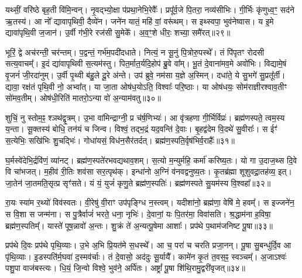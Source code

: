 यथ्सीं॒ वरि॑ष्ठे बृह॒ती वि॑मि॒न्वन्।
नृ॒वद्भ्यो॒क्षा प॑प्रथा॒नेभि॒रेवैः᳚।
प्रपू᳚र्व॒जे पि॒तरा॒ नव्य॑सीभिः।
गी॒र्भिः कृ॑णुध्व॒ꣳ॒ सद॑ने ऋ॒तस्य॑।
आ नो᳚ द्यावापृथिवी॒ दैव्ये॑न।
जने॑न यातं॒ महि॑ वां॒ वरू॑थम्।
स इथ्स्वपा॒ भुव॑नेष्वास।
य इ॒मे द्यावा॑पृथि॒वी ज॒जान॑।
उ॒र्वी ग॑भी॒रे रज॑सी सु॒मेके᳚।
अ॒व॒ꣳ॒शे धीरः॒ शच्या॒ समै॑रत्॥२९॥\ip

भूरिं॒ द्वे अच॑रन्ती॒ चर॑न्तम्।
प॒द्वन्तं॒ गर्भ॑म॒पदी॑दधाते।
नित्यं॒ न सू॒नुं पि॒त्रोरु॒पस्थे᳚।
तं पि॑पृतꣳ रोदसी सत्य॒वाचम्᳚।
इ॒दं द्या॑वापृथिवी स॒त्यम॑स्तु।
पित॒र्मात॒र्यदि॒होप॑ ब्रु॒वे वा᳚म्।
भू॒तं दे॒वाना॑मव॒मे अवो॑भिः।
विद्यामे॒षं वृ॒जनं॑ जी॒रदा॑नुम्।
उ॒र्वी पृ॒थ्वी ब॑हु॒ले दू॒रे अ॑न्ते।
उप॑ ब्रुवे॒ नम॑सा य॒ज्ञे अ॒स्मिन्।
दधा॑ते॒ ये सु॒भगे॑ सु॒प्रतू᳚र्ती।
द्यावा॒ रक्ष॑तं पृथि॒वी नो॒ अभ्वा᳚त्।
या जा॒ता ओष॑ध॒योऽति॒ विश्वाः᳚ परि॒ष्ठाः।
या ओष॑धयः॒ सोम॑राज्ञीरश्वाव॒तीꣳ सो॑मव॒तीम्।
ओष॑धी॒रिति॑ मातरो॒\-ऽन्या वो॑ अ॒न्याम॑वतु॥३०॥\ip\anuvakamend[ह॒विर्नो॑ दाद्भभूव रा॒तिं पू॒र्वहू॑ताव॒र्कैरै॑रद॒स्मिन्पञ्च॑ च]

शुचिं॒ नु स्तोम॒ꣴ॒ श्ञथ॑द्वृ॒त्रम्।
उ॒भा वा॑मिन्द्राग्नी॒ प्र च॑र्\mbox{}ष॒णिभ्यः॑।
आ वृ॑त्रहणा गी॒र्भिर्विप्रः॑।
ब्रह्म॑णस्पते॒ त्वम॒स्य य॒न्ता।
सू॒क्तस्य॑ बोधि॒ तन॑यं च जिन्व।
विश्वं॒ तद्भ॒द्रं यद॒वन्ति॑ दे॒वाः।
बृ॒हद्व॑देम वि॒दथे॑ सु॒वीराः᳚।
स ईꣳ॑ स॒त्येभिः॒ सखि॑भिः शु॒चद्भिः॑।
गोधा॑यसं॒ विध॑न॒सैर॑तर्दत्।
ब्रह्म॑ण॒स्पति॒र्वृष॑भिर्व॒राहैः᳚॥३१॥\ip

घ॒र्मस्वे॑देभि॒र्द्रवि॑णं॒ व्या॑नट्।
ब्रह्म॑ण॒स्पते॑रभवद्यथाव॒शम्।
स॒त्यो म॒न्युर्महि॒ कर्मा॑ करिष्य॒तः।
यो गा उ॒दाज॒थ्स दि॒वे वि चा॑भजत्।
म॒हीव॑ री॒तिः शव॑सा सर॒त्पृथ॑क्।
इन्धा॑नो अ॒ग्निं व॑नवद्वनुष्य॒तः।
कृ॒तब्र॑ह्मा शूशुवद्रा॒तह॑व्य॒ इत्।
जा॒तेन॑ जा॒तमति॒सृत्प्र सृꣳ॑सते।
यं यं॒ युजं॑ कृणु॒ते ब्रह्म॑ण॒स्पतिः॑।
ब्रह्म॑णस्पते सु॒यम॑स्य वि॒श्वहा᳚॥३२॥\ip

रा॒यः स्या॑म र॒थ्यो॑ विव॑स्वतः।
वी॒रेषु॑ वी॒राꣳ उप॑पृङ्ग्धि न॒स्त्वम्।
यदीशा॑नो॒ ब्रह्म॑णा॒ वेषि॑ मे॒ हवम्᳚।
स इज्जने॑न॒ स वि॒शा स जन्म॑ना।
स पु॒त्रैर्वाजं॑ भरते॒ धना॒ नृभिः॑।
दे॒वानां॒ यः पि॒तर॑मा॒ विवा॑सति।
श्र॒द्धाम॑ना ह॒विषा॒ ब्रह्म॑ण॒स्पतिम्᳚।
यास्ते॑ पूष॒न्नावो॑ अ॒न्तः।
शु॒क्रं ते॑ अ॒न्यत्पू॒षेमा आशाः᳚।
प्रप॑थे प॒थाम॑जनिष्ट पू॒षा॥३३॥\ip

प्रप॑थे दि॒वः प्रप॑थे पृथि॒व्याः।
उ॒भे अ॒भि प्रि॒यत॑मे स॒धस्थे᳚।
आ च॒ परा॑ च चरति प्रजा॒नन्।
पू॒षा सु॒बन्धु॑र्दि॒व आ पृ॑थि॒व्याः।
इ॒डस्पति॑र्म॒घवा॑ द॒स्मव॑र्चाः।
तं दे॒वासो॒ अद॑दुः सू॒र्यायै᳚।
कामे॑न कृ॒तं त॒वस॒ꣴ॒ स्वञ्चम्᳚।
अ॒जाऽश्वः॑ पशु॒पा वाज॑बस्त्यः।
धि॒यं॒ जि॒न्वो विश्वे॒ भुव॑ने॒ अर्पि॑तः।
अष्ट्रां᳚ पू॒षा शि॑थि॒रामु॒द्वरी॑वृजत्॥३४॥\ip

